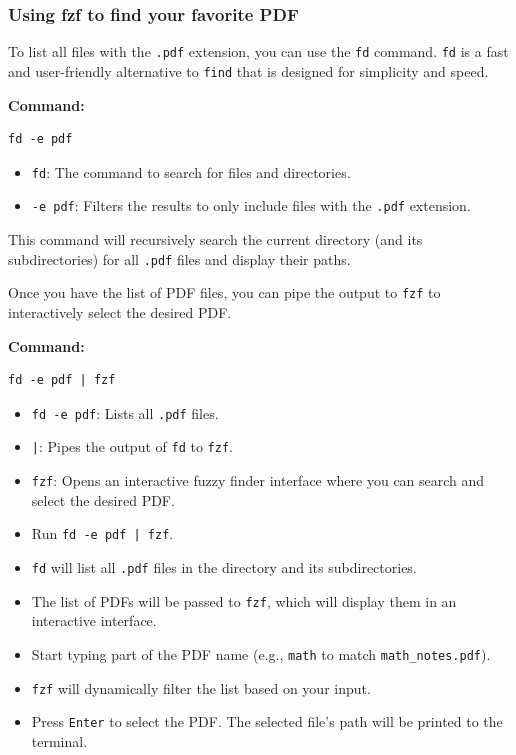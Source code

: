 \documentclass{article}
\newcounter{subsubsubsection}[subsubsection]
\begin{document}
\subsubsection{Using fzf to find your favorite PDF}

To list all files with the \texttt{.pdf} extension, you can use the \texttt{fd} command. \texttt{fd} is a fast and user-friendly alternative to \texttt{find} that is designed for simplicity and speed.

\textbf{Command:}
\begin{verbatim}
fd -e pdf
\end{verbatim}

\begin{itemize}
    \item \texttt{fd}: The command to search for files and directories.
    \item \texttt{-e pdf}: Filters the results to only include files with the \texttt{.pdf} extension.
\end{itemize}

This command will recursively search the current directory (and its subdirectories) for all \texttt{.pdf} files and display their paths.


Once you have the list of PDF files, you can pipe the output to \texttt{fzf} to interactively select the desired PDF.

\textbf{Command:}
\begin{verbatim}
fd -e pdf | fzf
\end{verbatim}

\begin{itemize}
    \item \texttt{fd -e pdf}: Lists all \texttt{.pdf} files.
    \item \texttt{|}: Pipes the output of \texttt{fd} to \texttt{fzf}.
    \item \texttt{fzf}: Opens an interactive fuzzy finder interface where you can search and select the desired PDF.
\end{itemize}

\begin{itemize}
    \item Run \texttt{fd -e pdf | fzf}.
    \item \texttt{fd} will list all \texttt{.pdf} files in the directory and its subdirectories.
    \item The list of PDFs will be passed to \texttt{fzf}, which will display them in an interactive interface.
    \item Start typing part of the PDF name (e.g., \texttt{math} to match \texttt{math\_notes.pdf}).
    \item \texttt{fzf} will dynamically filter the list based on your input.
    \item Press \texttt{Enter} to select the PDF. The selected file's path will be printed to the terminal.
\end{itemize}
\end{document}
